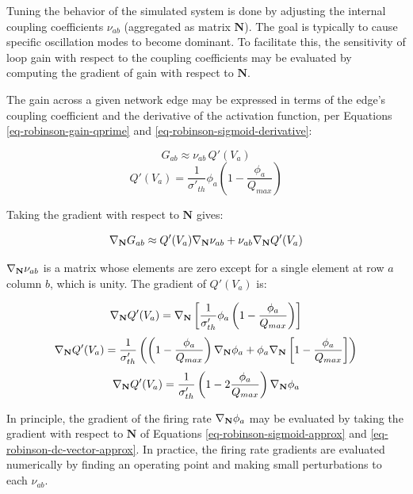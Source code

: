 Tuning the behavior of the simulated system is done by adjusting the
internal coupling coefficients $\nu_{ab}$ (aggregated as matrix
$\mathbf{N}$). The goal is typically to cause specific oscillation modes
to become dominant. To facilitate this, the sensitivity of loop gain with
respect to the coupling coefficients may be evaluated by computing the
gradient of gain with respect to $\mathbf{N}$.

The gain across a given network edge may be expressed in terms of the
edge's coupling coefficient and the derivative of the activation function,
per Equations \ref{eq-robinson-gain-qprime} and
\ref{eq-robinson-sigmoid-derivative}:

\begin{equation}
G_{ab} \approx \nu_{ab} \, Q'(V_a)
\end{equation}
%
\begin{equation}
Q'(V_a) = \frac{1}{\sigma'_{th}} \phi_a
\left ( 1 - \frac{\phi_a}{Q_{max}} \right )
\end{equation}

Taking the gradient with respect to $\mathbf{N}$ gives:

\begin{equation}
\nabla_{\mathbf{N}} G_{ab} \approx Q'(V_a) \nabla_{\mathbf{N}} \nu_{ab} + \nu_{ab} \nabla_{\mathbf{N}} Q'(V_a)
\label{eq-robinson-gain-gradient}
\end{equation}

$\nabla_{\mathbf{N}} \nu_{ab}$ is a matrix whose elements are zero except for a single
element at row $a$ column $b$, which is unity. The gradient of $Q'(V_a)$ is:

\begin{equation}
\nabla_{\mathbf{N}} Q'(V_a) = \nabla_{\mathbf{N}} \left [
\frac{1}{\sigma'_{th}} \phi_a \left ( 1 - \frac{\phi_a}{Q_{max}} \right )
\right ]
\end{equation}
%
\begin{equation}
\nabla_{\mathbf{N}} Q'(V_a) =
\frac{1}{\sigma'_{th}} \left (
\left ( 1 - \frac{\phi_a}{Q_{max}} \right ) \nabla_{\mathbf{N}} \phi_a
+ \phi_a \nabla_{\mathbf{N}} \left [ 1 - \frac{\phi_a}{Q_{max}} \right ]
\right )
\end{equation}
%
\begin{equation}
\nabla_{\mathbf{N}} Q'(V_a) = \frac{1}{\sigma'_{th}}
\left ( 1 - 2 \frac{\phi_a}{Q_{max}} \right ) \nabla_{\mathbf{N}} \phi_a
\label{eq-robinson-qprime-gradient}
\end{equation}

In principle, the gradient of the firing rate $\nabla_{\mathbf{N}} \phi_a$ may be
evaluated by taking the gradient with respect to $\mathbf{N}$ of Equations
\ref{eq-robinson-sigmoid-approx} and \ref{eq-robinson-dc-vector-approx}. In
practice, the firing rate gradients are evaluated numerically by finding an
operating point and making small perturbations to each $\nu_{ab}$.

